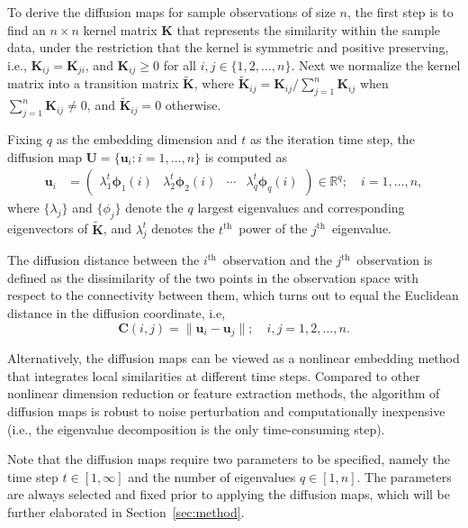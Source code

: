 \documentclass[12pt]{article}
\theoremstyle{definition}
\begin{document}
	To derive the diffusion maps for sample observations of size $n$, the first step is to find an $n \times n$ kernel matrix $\mathbf{K}$ that represents the similarity within the sample data, under the restriction that the kernel is symmetric and positive preserving, i.e., $\mathbf{K}_{ij}=\mathbf{K}_{ji}$, and $\mathbf{K}_{ij} \geq 0$ for all $i,j \in \{1, 2, \ldots, n\}$. Next we normalize the kernel matrix into a transition matrix $\mathbf{\widetilde{K}}$, where $\mathbf{\widetilde{K}}_{ij} = \mathbf{K}_{ij} / \sum\limits_{j=1}^{n} \mathbf{K}_{ij}$ when $\sum\limits_{j=1}^{n} \mathbf{K}_{ij} \neq 0$, and $\mathbf{\widetilde{K}}_{ij}=0$ otherwise.
	
	Fixing $q$ as the embedding dimension and $t$ as the iteration time step, the diffusion map $\mathbf{U}=\{\mathbf{u}_i : i=1,\ldots,n\}$ is computed as 
	\begin{align}
		\label{eq:U}
		\mathbf{u}_i  &= \begin{pmatrix} \lambda^{t}_{1} \mathbf{\phi}_{1}(i) & \lambda^{t}_{2} \mathbf{\phi}_{2} (i)  & \cdots & \lambda^{t}_{q} \mathbf{\phi}_{q}(i) \end{pmatrix} \in \mathbb{R}^{q}; \quad i = 1, \ldots, n,
	\end{align}
	where $\{ \lambda_{j} \}$ and $\{ \phi_{j}  \}$ denote the $q$ largest eigenvalues and corresponding eigenvectors of $\mathbf{\widetilde{K}}$, and $\lambda^{t}_{j}$ denotes the $t^{\mbox{th}}$~power of the $j^{\mbox{th}}$~eigenvalue.
	
	The diffusion distance between the $i^{\mbox{th}}$~observation and the $j^{\mbox{th}}$~observation is defined as the dissimilarity of the two points in the observation space with respect to the connectivity between them, which turns out to equal the Euclidean distance in the diffusion coordinate, i.e,
	\begin{equation}
	\label{eq:diffusion}
	\mathbf{C}(i,j)  =   \| \mathbf{u}_i - \mathbf{u}_j \|; \quad i,j = 1,2, \ldots , n.
	\end{equation}
	
	Alternatively, the diffusion maps can be viewed as a nonlinear embedding method that integrates local similarities at different time steps. Compared to other nonlinear dimension reduction or feature extraction methods, the algorithm of diffusion maps is robust to noise perturbation and computationally inexpensive (i.e., the eigenvalue decomposition is the only time-consuming step). 
	
	Note that the diffusion maps require two parameters to be specified, namely the time step $t \in [1,\infty]$ and the number of eigenvalues $q \in [1,n]$. The parameters are always selected and fixed prior to applying the diffusion maps, which will be further elaborated in Section~\ref{sec:method}. 
	
\end{document}
